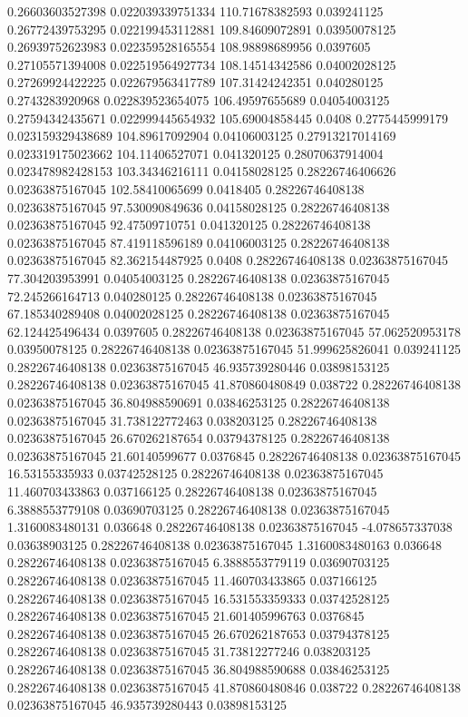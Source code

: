 0.26603603527398 0.022039339751334 110.71678382593 0.039241125
0.26772439753295 0.022199453112881 109.84609072891 0.03950078125
0.26939752623983 0.022359528165554 108.98898689956 0.0397605
0.27105571394008 0.022519564927734 108.14514342586 0.04002028125
0.27269924422225 0.022679563417789 107.31424242351 0.040280125
0.2743283920968 0.022839523654075 106.49597655689 0.04054003125
0.27594342435671 0.022999445654932 105.69004858445 0.0408
0.2775445999179 0.023159329438689 104.89617092904 0.04106003125
0.27913217014169 0.023319175023662 104.11406527071 0.041320125
0.28070637914004 0.023478982428153 103.34346216111 0.04158028125
0.28226746406626 0.02363875167045 102.58410065699 0.0418405
0.28226746408138 0.02363875167045 97.530090849636 0.04158028125
0.28226746408138 0.02363875167045 92.47509710751 0.041320125
0.28226746408138 0.02363875167045 87.419118596189 0.04106003125
0.28226746408138 0.02363875167045 82.362154487925 0.0408
0.28226746408138 0.02363875167045 77.304203953991 0.04054003125
0.28226746408138 0.02363875167045 72.245266164713 0.040280125
0.28226746408138 0.02363875167045 67.185340289408 0.04002028125
0.28226746408138 0.02363875167045 62.124425496434 0.0397605
0.28226746408138 0.02363875167045 57.062520953178 0.03950078125
0.28226746408138 0.02363875167045 51.999625826041 0.039241125
0.28226746408138 0.02363875167045 46.935739280446 0.03898153125
0.28226746408138 0.02363875167045 41.870860480849 0.038722
0.28226746408138 0.02363875167045 36.804988590691 0.03846253125
0.28226746408138 0.02363875167045 31.738122772463 0.038203125
0.28226746408138 0.02363875167045 26.670262187654 0.03794378125
0.28226746408138 0.02363875167045 21.60140599677 0.0376845
0.28226746408138 0.02363875167045 16.53155335933 0.03742528125
0.28226746408138 0.02363875167045 11.460703433863 0.037166125
0.28226746408138 0.02363875167045 6.3888553779108 0.03690703125
0.28226746408138 0.02363875167045 1.3160083480131 0.036648
0.28226746408138 0.02363875167045 -4.078657337038 0.03638903125
0.28226746408138 0.02363875167045 1.3160083480163 0.036648
0.28226746408138 0.02363875167045 6.3888553779119 0.03690703125
0.28226746408138 0.02363875167045 11.460703433865 0.037166125
0.28226746408138 0.02363875167045 16.531553359333 0.03742528125
0.28226746408138 0.02363875167045 21.601405996763 0.0376845
0.28226746408138 0.02363875167045 26.670262187653 0.03794378125
0.28226746408138 0.02363875167045 31.73812277246 0.038203125
0.28226746408138 0.02363875167045 36.804988590688 0.03846253125
0.28226746408138 0.02363875167045 41.870860480846 0.038722
0.28226746408138 0.02363875167045 46.935739280443 0.03898153125
